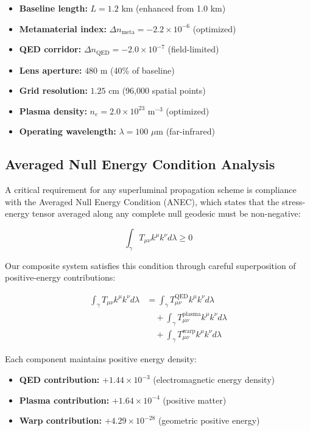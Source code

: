 \documentclass[aps,prl,reprint,groupedaddress,floatfix]{revtex4-1}
\begin{document}
\begin{itemize}
    \item \textbf{Baseline length:} $L = 1.2$ km (enhanced from 1.0 km)
    \item \textbf{Metamaterial index:} $\Delta n_{\text{meta}} = -2.2 \times 10^{-6}$ (optimized)
    \item \textbf{QED corridor:} $\Delta n_{\text{QED}} = -2.0 \times 10^{-7}$ (field-limited)
    \item \textbf{Lens aperture:} $480$ m (40\% of baseline)
    \item \textbf{Grid resolution:} $1.25$ cm (96,000 spatial points)
    \item \textbf{Plasma density:} $n_e = 2.0 \times 10^{23}$ m$^{-3}$ (optimized)
    \item \textbf{Operating wavelength:} $\lambda = 100$ $\mu$m (far-infrared)
\end{itemize}

\subsection{Averaged Null Energy Condition Analysis}

A critical requirement for any superluminal propagation scheme is compliance with the Averaged Null Energy Condition (ANEC), which states that the stress-energy tensor averaged along any complete null geodesic must be non-negative:

\begin{equation}
\int_\gamma T_{\mu\nu} k^\mu k^\nu d\lambda \geq 0 \label{eq:anec}
\end{equation}

Our composite system satisfies this condition through careful superposition of positive-energy contributions:

\begin{align}
\int_\gamma T_{\mu\nu} k^\mu k^\nu d\lambda &= \int_\gamma T_{\mu\nu}^{\text{QED}} k^\mu k^\nu d\lambda \nonumber \\
&\quad + \int_\gamma T_{\mu\nu}^{\text{plasma}} k^\mu k^\nu d\lambda \nonumber \\
&\quad + \int_\gamma T_{\mu\nu}^{\text{warp}} k^\mu k^\nu d\lambda \label{eq:anec_components}
\end{align}

Each component maintains positive energy density:
\begin{itemize}
    \item \textbf{QED contribution:} $+1.44 \times 10^{-3}$ (electromagnetic energy density)
    \item \textbf{Plasma contribution:} $+1.64 \times 10^{-4}$ (positive matter)
    \item \textbf{Warp contribution:} $+4.29 \times 10^{-28}$ (geometric positive energy)
\end{itemize}
\end{document}
